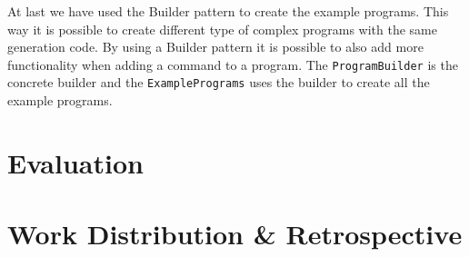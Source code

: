 \documentclass[11pt,a4paper]{article}
\begin{document}
At last we have used the Builder pattern to create the example programs.
This way it is possible to create different type of complex programs with the same generation code.
By using a Builder pattern it is possible to also add more functionality when adding a command to a program.
The \texttt{ProgramBuilder} is the concrete builder and the \texttt{ExamplePrograms} uses the builder to create all the example programs.




\section*{Evaluation}

\section*{Work Distribution \& Retrospective}
\end{document}
